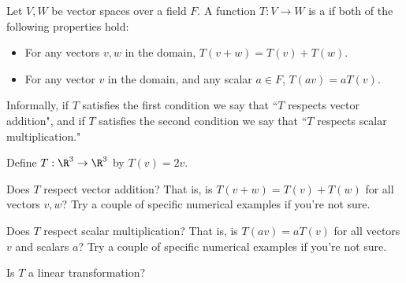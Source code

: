 

\endedxvertical











{} 
Let $V,W$ be vector spaces over a field $F$.    A function $T: V\rightarrow W$ is a {}
if both of the following properties hold:

\begin{itemize}
\item For any vectors $v, w$ in the domain, $T(v + w) = T(v) + T(w).$ 
\item For any vector $v$ in the domain, and any scalar $a\in F$, $T(av) = aT(v)$.    
\end{itemize}

Informally, if $T$ satisfies the first condition we say that ``$T$ respects vector addition", and 
if $T$ satisfies the second condition we say that ``$T$ respects scalar multiplication."  

\endedxtext

\endedxvertical






Define $T: \R^3 \rightarrow \R^3$ by $T(v) = 2v$.  

Does $T$ respect vector addition?  That is, is $T(v + w) = T(v) + T(w)$ for all 
vectors $v,w$?
Try a couple of specific numerical examples if you're not sure.  


Does $T$ respect scalar multiplication?  
That is, is $T(av) = aT(v)$ for all vectors $v$ and scalars $a$?
Try a couple of specific numerical examples if you're not sure.  



Is $T$ a linear transformation?



